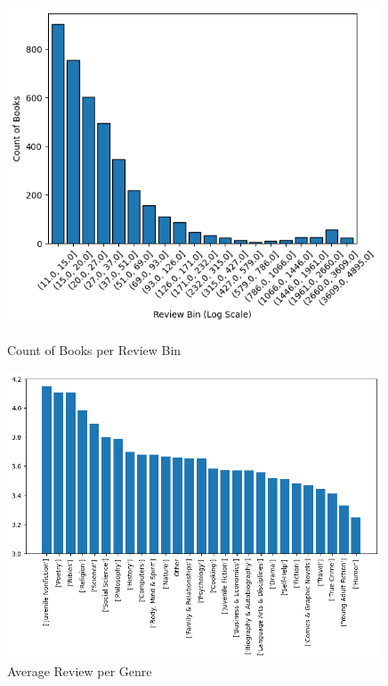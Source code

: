 \documentclass[12pt]{article}
\numberwithin{equation}{section}
\begin{document}
   \begin{figure}[ht]

\begin{minipage}[b]{0.49\linewidth}
    \centering
    \includegraphics[width=0.99\textwidth]{reviewcount.png}
    \caption{Count of Books per Review Bin }
    \end{minipage}
        \hspace{0.01cm}
       \begin{minipage}[b]{0.49\linewidth}
    \centering
    \includegraphics[width=0.99\textwidth]{genre_reviews.png}
    \caption{Average Review per Genre}
   \end{minipage}

\end{figure}
\end{document}
